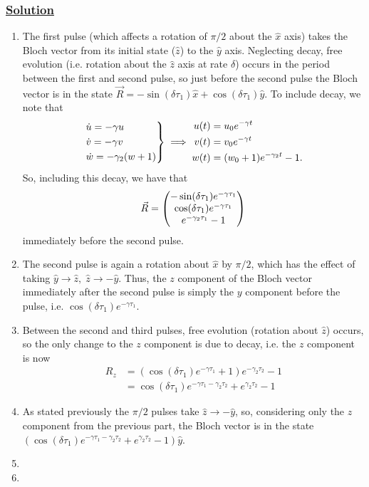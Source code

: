 \documentclass[12pt]{article}
\begin{document}
\subsubsection*{\underline{Solution}}
\begin{enumerate}[label=(\alph*)]
    \item The first pulse (which affects a rotation of $\pi/2$ about the $\hat{x}$ axis) takes the Bloch vector from its initial state ($\hat{z}$) to the $\hat{y}$ axis.
    Neglecting decay, free evolution (i.e. rotation about the $\hat{z}$ axis at rate $\delta$) occurs in the period between the first and second pulse, so just before the second pulse the Bloch vector is in the state $\vec{R} = -\sin(\delta\tau_1)\hat{x} + \cos(\delta\tau_1)\hat{y}$.
    To include decay, we note that
    \[
    \begin{rcases*}
        \dot{u} = -\gamma u \\
        \dot{v} = -\gamma v \\
        \dot{w} = -\gamma_2(w + 1)
    \end{rcases*}
    \implies
    \begin{aligned}
        u(t) &= u_0e^{-\gamma t} \\
        v(t) &= v_0e^{-\gamma t} \\
        w(t) &= (w_0 + 1)e^{-\gamma_2 t} - 1.
    \end{aligned} 
    \]
    So, including this decay, we have that
    \[ \vec{R} = \mqty(-\sin(\delta\tau_1)e^{-\gamma\tau_1} \\ \cos(\delta\tau_1)e^{-\gamma \tau_1} \\ e^{-\gamma_2\tau_1} - 1) \]
    immediately before the second pulse.
    \item The second pulse is again a rotation about $\hat{x}$ by $\pi/2$, which has the effect of taking $\hat{y}\to\hat{z}, \; \hat{z}\to-\hat{y}$. 
    Thus, the $z$ component of the Bloch vector immediately after the second pulse is simply the $y$ component before the pulse, i.e. $\cos(\delta\tau_1)e^{-\gamma\tau_1}$.
    \item Between the second and third pulses, free evolution (rotation about $\hat{z}$) occurs, so the only change to the $z$ component is due to decay, i.e. the $z$ component is now
    \begin{align*}
        R_z &= (\cos(\delta\tau_1)e^{-\gamma\tau_1} + 1)e^{-\gamma_2\tau_2} - 1 \\
        &= \cos(\delta\tau_1)e^{-\gamma\tau_1 - \gamma_2\tau_2} + e^{\gamma_2\tau_2} - 1
    \end{align*}
    \item As stated previously the $\pi/2$ pulses take $\hat{z}\to-\hat{y}$, so, considering only the $z$ component from the previous part, the Bloch vector is in the state $\left(\cos(\delta\tau_1)e^{-\gamma\tau_1 - \gamma_2\tau_2} + e^{\gamma_2\tau_2} - 1\right)\hat{y}$.
    \item  
    \item 
\end{enumerate}
\end{document}
